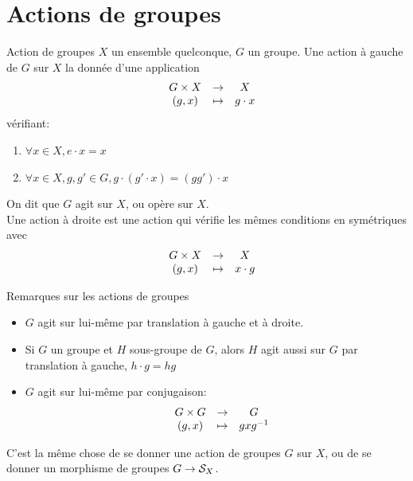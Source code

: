 \documentclass[]{report}
\begin{document}
\chapter{Actions de groupes}

\begin{df}{Action de groupes}{}
    $X$ un ensemble quelconque, $G$ un groupe. Une action à gauche de $G$ sur $X$ la donnée d'une application
    \[\begin{array}{ccccc} & G\times X & \to & X \\ & (g,x) & \mapsto & g\cdot x \end{array}\]
    vérifiant: \begin{enumerate}
        \item $\forall x\in X,e\cdot x=x$
        \item $\forall x\in X,g,g'\in G, g\cdot (g'\cdot x)=(gg')\cdot x$
    \end{enumerate}
    On dit que $G$ agit sur $X$, ou opère sur $X$.\\
    Une action à droite est une action qui vérifie les mêmes conditions en symétriques avec
    \[\begin{array}{ccccc} & G\times X & \to & X \\ & (g,x) & \mapsto & x\cdot g \end{array}\]
\end{df}

\begin{re}{Remarques sur les actions de groupes}{}
    \begin{itemize}
        \item $G$ agit sur lui-même par translation à gauche et à droite.
        \item Si $G$ un groupe et $H$ sous-groupe de $G$, alors $H$ agit aussi sur $G$ par translation à gauche, $h\cdot g=hg$
        \item $G$ agit sur lui-même par conjugaison:
        \[\begin{array}{ccccc} & G\times G & \to & G \\ & (g,x) & \mapsto & gxg^{-1} \end{array}\]
    \end{itemize}
\end{re}

\begin{prop}{}{}
    C'est la même chose de se donner une action de groupes $G$ sur $X$, ou de se donner un morphisme de groupes $G\to \mathcal{S}_X$.
\end{prop}
\end{document}
